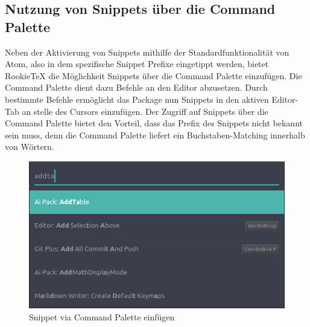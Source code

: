         \subsection{Nutzung von Snippets über die Command Palette}
            Neben der Aktivierung von Snippets mithilfe der Standardfunktionalität von Atom, also in dem spezifische Snippet Prefixe eingetippt werden, bietet RookieTeX die Möglichkeit Snippets über die Command Palette einzufügen. Die Command Palette dient dazu Befehle an den Editor abzusetzen. Durch bestimmte Befehle ermöglicht das Package nun \latex Snippets in den aktiven Editor-Tab an stelle des Cursors einzufügen. Der Zugriff auf Snippets über die Command Palette bietet den Vorteil, dass das Prefix des Snippets nicht bekannt sein muss, denn die Command Palette liefert ein Buchstaben-Matching innerhalb von Wörtern.
            \begin{figure}[H]
                \centering
                    \includegraphics[scale=0.7]{img/snippets_via_cp.png}
                    \caption{Snippet via Command Palette einfügen}
            \end{figure}

